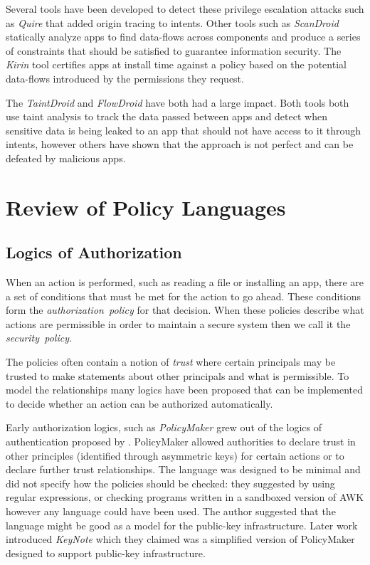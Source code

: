 \documentclass[a4paper]{article}
\begin{document}
Several tools have been developed to detect these privilege escalation attacks
such as \emph{Quire}\cite{Bugiel:2012ui} that added origin tracing to intents.
Other tools such as \emph{ScanDroid}\cite{Fuchs:2009vi} statically analyze apps
to find data-flows across components and produce a series of constraints that
should be satisfied to guarantee information security. The
\emph{Kirin}\cite{Enck:2009ko} tool certifies apps at install time against a
policy based on the potential data-flows introduced by the permissions they
request.

The \emph{TaintDroid}\cite{Enck:2010uw} and \emph{FlowDroid}\cite{Fritz:2013vi}
have both had a large impact. Both tools both use taint analysis to track the
data passed between apps and detect when sensitive data is being leaked to an
app that should not have access to it through intents, however others have shown
that the approach is not perfect\cite{Sarwar:2013ta} and can be defeated by
malicious apps.


\section{Review of Policy Languages}

\subsection{Logics of Authorization}

When an action is performed, such as reading a file or installing an app, there
are a set of conditions that must be met for the action to go ahead. These
conditions form the \emph{authorization~policy} for that decision. When these
policies describe what actions are permissible in order to maintain a secure
system then we call it the \emph{security~policy}.

The policies often contain a notion of \emph{trust} where certain principals
may be trusted to make statements about other principals and what is
permissible. To model the relationships many logics have been proposed that can
be implemented to decide whether an action can be authorized automatically.

Early authorization logics, such as \emph{PolicyMaker}\cite{Blaze:dj} grew out
of the logics of authentication proposed by
\citeauthor*{Wobber:1994dh}\cite{Lampson:1992jg}\cite{Wobber:1994dh}.
PolicyMaker allowed authorities to declare trust in other principles (identified
through asymmetric keys) for certain actions or to declare further trust
relationships. The language was designed to be minimal and did not specify how
the policies should be checked: they suggested by using regular expressions, or
checking programs written in a sandboxed version of AWK however any language
could have been used. The author suggested that the language might be good as a
model for the public-key infrastructure. Later work introduced
\emph{KeyNote}\cite{Blaze:1999fa} which they claimed was a simplified version of
PolicyMaker designed to support public-key infrastructure.
\end{document}
